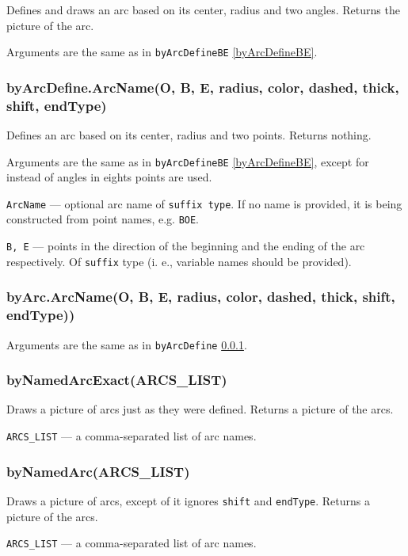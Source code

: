 \documentclass{ltxdoc}
\begin{document}
	Defines and draws an arc based on its center, radius and two angles. Returns the picture of the arc.
	
	Arguments are the same as in \texttt{byArcDefineBE} \ref{byArcDefineBE}.

\subsubsection{byArcDefine.ArcName(O, B, E, radius, color, dashed, thick, shift, endType)}\label{byArcDefine}
	
	Defines an arc based on its center, radius and two points. Returns nothing.
	
	Arguments are the same as in \texttt{byArcDefineBE} \ref{byArcDefineBE}, except for instead of angles in eights points are used.
	
	\texttt{ArcName} — optional arc name of \texttt{suffix type}. If no name is provided, it is being constructed from point names, e.g. \texttt{BOE}.
	
	\texttt{B, E} — points in the direction of the beginning and the ending of the arc respectively. Of \texttt{suffix} type (i. e., variable names should be provided).

\subsubsection{byArc.ArcName(O, B, E, radius, color, dashed, thick, shift, endType))}\label{byArc}
	
	Arguments are the same as in \texttt{byArcDefine} \ref{byArcDefine}.
	
\subsubsection{byNamedArcExact(ARCS\_LIST)}\label{byNamedArcExact}
	Draws a picture of arcs just as they were defined. Returns a picture of the arcs.
	
	\texttt{ARCS\_LIST} — a comma-separated list of arc names.
	
\subsubsection{byNamedArc(ARCS\_LIST)}\label{byNamedArc}
	Draws a picture of arcs, except of it ignores \texttt{shift} and \texttt{endType}. Returns a picture of the arcs.
	
	\texttt{ARCS\_LIST} — a comma-separated list of arc names.
\end{document}
